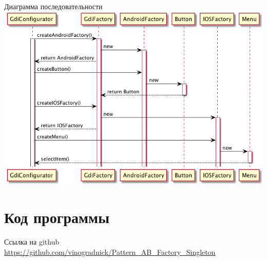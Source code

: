 \documentclass[PI,LAB]{HSEUniversity}
\begin{document}
\begin{FIGURE}[h]{Диаграмма последовательности\label{fig:example-figure}}
	\includegraphics[width=\textwidth]{../out/diagrams/seq-go/seq-go}
\end{FIGURE}



\section{Код программы }

Ссылка на github \url{https://github.com/vinogradnick/Pattern_AB_Factory_Singleton}

\lstset{extendedchars=\true}
\end{document}

